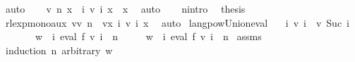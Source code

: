 \begin{isabellebody}
\ auto\isanewline
\ \ \isamarkupfalse%
\ {\isachardoublequoteopen}v\ n\ x\ {\isasymsubseteq}\ {\isacharparenleft}{\kern0pt}{\isasymUnion}i{\isachardot}{\kern0pt}\ v\ i\ x{\isacharparenright}{\kern0pt}{\isachardoublequoteclose}\ \ x\ \isamarkupfalse%
\ auto\isanewline
\ \ \isamarkupfalse%
\ n{\isacharunderscore}{\kern0pt}intro\ \isamarkupfalse%
\ {\isachardoublequoteopen}{\isacharquery}{\kern0pt}thesis{\isachardoublequoteclose}\isanewline
\ \ \ \ \isamarkupfalse%
\ rlexp{\isacharunderscore}{\kern0pt}mono{\isacharunderscore}{\kern0pt}aux{\isacharbrackleft}{\kern0pt}\ v{\isacharequal}{\kern0pt}{\isachardoublequoteopen}v\ n{\isachardoublequoteclose}\ \ v{\isacharprime}{\kern0pt}{\isacharequal}{\kern0pt}{\isachardoublequoteopen}{\isasymlambda}x{\isachardot}{\kern0pt}\ {\isasymUnion}i{\isachardot}{\kern0pt}\ v\ i\ x{\isachardoublequoteclose}{\isacharbrackright}{\kern0pt}\ \isamarkupfalse%
\ auto\isanewline
{}\isamarkupfalse%
%
\endisatagproof
{\isafoldproof}%
%
\isadelimproof
\isanewline
%
\endisadelimproof
\isanewline
{}\isamarkupfalse%
\ langpow{\isacharunderscore}{\kern0pt}Union{\isacharunderscore}{\kern0pt}eval{\isacharcolon}{\kern0pt}\isanewline
\ \ \ {\isachardoublequoteopen}{\isasymforall}i{\isachardot}{\kern0pt}\ v\ i\ {\isasymle}\ v\ {\isacharparenleft}{\kern0pt}Suc\ i{\isacharparenright}{\kern0pt}{\isachardoublequoteclose}\isanewline
\ \ \ \ \ \ \ {\isachardoublequoteopen}w\ {\isasymin}\ {\isacharparenleft}{\kern0pt}{\isasymUnion}i{\isachardot}{\kern0pt}\ eval\ f\ {\isacharparenleft}{\kern0pt}v\ i{\isacharparenright}{\kern0pt}{\isacharparenright}{\kern0pt}\ {\isacharcircum}{\kern0pt}{\isacharcircum}{\kern0pt}\ n{\isachardoublequoteclose}\isanewline
\ \ \ \ \ {\isachardoublequoteopen}w\ {\isasymin}\ {\isacharparenleft}{\kern0pt}{\isasymUnion}i{\isachardot}{\kern0pt}\ eval\ f\ {\isacharparenleft}{\kern0pt}v\ i{\isacharparenright}{\kern0pt}\ {\isacharcircum}{\kern0pt}{\isacharcircum}{\kern0pt}\ n{\isacharparenright}{\kern0pt}{\isachardoublequoteclose}\isanewline
%
\isadelimproof
%
\endisadelimproof
%
\isatagproof
{}\isamarkupfalse%
\ assms\ \isamarkupfalse%
\ {\isacharparenleft}{\kern0pt}induction\ n\ arbitrary{\isacharcolon}{\kern0pt}\ w{\isacharparenright}{\kern0pt}\isanewline
\ \ \isamarkupfalse%
\ {}\isanewline

\end{isabellebody}
